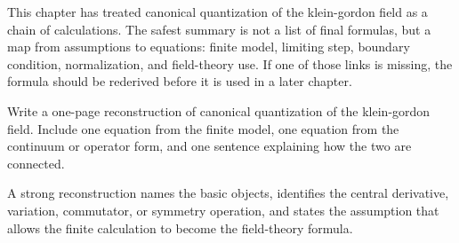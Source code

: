 This chapter has treated canonical quantization of the klein-gordon field as a chain of calculations.  The safest summary is not a list of final formulas, but a map from assumptions to equations: finite model, limiting step, boundary condition, normalization, and field-theory use.  If one of those links is missing, the formula should be rederived before it is used in a later chapter.

\begin{exercise}
Write a one-page reconstruction of canonical quantization of the klein-gordon field.  Include one equation from the finite model, one equation from the continuum or operator form, and one sentence explaining how the two are connected.
\begin{answer}
A strong reconstruction names the basic objects, identifies the central derivative, variation, commutator, or symmetry operation, and states the assumption that allows the finite calculation to become the field-theory formula.
\end{answer}
\end{exercise}
